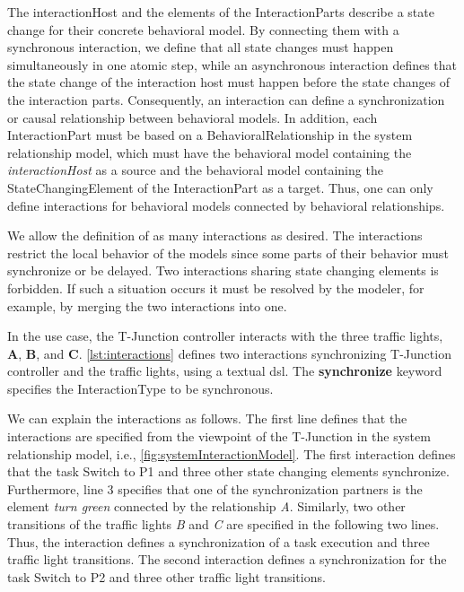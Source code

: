 \documentclass{jot}
\begin{document}
The \textsf{interactionHost} and the elements of the \textsf{InteractionPart}s describe a state change for their concrete behavioral model.
By connecting them with a synchronous interaction, we define that all state changes must happen simultaneously in one atomic step, while an asynchronous interaction defines that the state change of the interaction host must happen before the state changes of the interaction parts. 
Consequently, an interaction can define a synchronization or causal relationship between behavioral models.
In addition, each \textsf{InteractionPart} must be based on a \textsf{BehavioralRelationship} in the system relationship model, which must have the behavioral model containing the \textit{interactionHost} as a source and the behavioral model containing the \textsf{StateChangingElement} of the \textsf{InteractionPart} as a target.
Thus, one can only define interactions for behavioral models connected by behavioral relationships.

We allow the definition of as many interactions as desired.
The interactions restrict the local behavior of the models since some parts of their behavior must synchronize or be delayed.
Two interactions sharing state changing elements is forbidden.
If such a situation occurs it must be resolved by the modeler, for example, by merging the two interactions into one.

In the use case, the T-Junction controller interacts with the three traffic lights, \textbf{A}, \textbf{B}, and \textbf{C}.
\autoref{lst:interactions} defines two interactions synchronizing T-Junction controller and the traffic lights, using a textual \gls*{dsl}.
The \textbf{synchronize} keyword specifies the \textsf{InteractionType} to be \textsf{synchronous}.



We can explain the interactions as follows.
The first line defines that the interactions are specified from the viewpoint of the T-Junction in the system relationship model, i.e., \autoref{fig:systemInteractionModel}.
The first interaction defines that the task \textsf{Switch to P1} and three other state changing elements synchronize.
Furthermore, line 3 specifies that one of the synchronization partners is the element \textit{turn green} connected by the relationship \textit{A}.
Similarly, two other transitions of the traffic lights \textit{B} and \textit{
C} are specified in the following two lines.
Thus, the interaction defines a synchronization of a task execution and three traffic light transitions. 
The second interaction defines a synchronization for the task \textsf{Switch to P2} and three other traffic light transitions.
\end{document}

